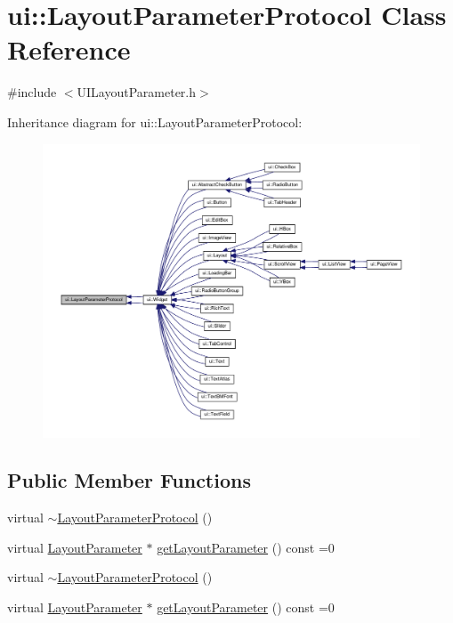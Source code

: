 \hypertarget{classui_1_1LayoutParameterProtocol}{}\section{ui\+:\+:Layout\+Parameter\+Protocol Class Reference}
\label{classui_1_1LayoutParameterProtocol}


{\ttfamily \#include $<$U\+I\+Layout\+Parameter.\+h$>$}



Inheritance diagram for ui\+:\+:Layout\+Parameter\+Protocol\+:
\nopagebreak
\begin{figure}[H]
\begin{center}
\leavevmode
\includegraphics[width=350pt]{classui_1_1LayoutParameterProtocol__inherit__graph}
\end{center}
\end{figure}
\subsection*{Public Member Functions}
\begin{DoxyCompactItemize}
\item 
virtual \hyperlink{classui_1_1LayoutParameterProtocol_a0b3729d1f83f8822f2b03523e67bb47b}{$\sim$\+Layout\+Parameter\+Protocol} ()
\item 
virtual \hyperlink{classui_1_1LayoutParameter}{Layout\+Parameter} $\ast$ \hyperlink{classui_1_1LayoutParameterProtocol_a188012c584b8f9ccca95b1dffea6fb0b}{get\+Layout\+Parameter} () const =0
\item 
virtual \hyperlink{classui_1_1LayoutParameterProtocol_a0b3729d1f83f8822f2b03523e67bb47b}{$\sim$\+Layout\+Parameter\+Protocol} ()
\item 
virtual \hyperlink{classui_1_1LayoutParameter}{Layout\+Parameter} $\ast$ \hyperlink{classui_1_1LayoutParameterProtocol_a188012c584b8f9ccca95b1dffea6fb0b}{get\+Layout\+Parameter} () const =0
\end{DoxyCompactItemize}


